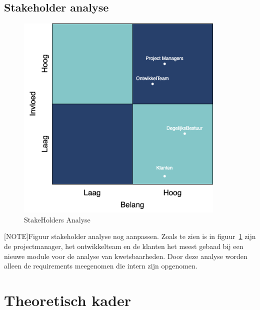 \subsection{Stakeholder analyse}\label{subsec:stakeholder-analyse1}
\begin{figure}[H]
    \myfloatalign
    \includegraphics[width=10cm]{gfx/stakeholderanalyse}
    \caption{StakeHolders Analyse}
    \label{fig:StakeholderAnalyse1}
\end{figure}
[NOTE]Figuur stakeholder analyse nog aanpassen.
Zoals te zien is in figuur~\ref{fig:StakeholderAnalyse1} zijn de projectmanager, het ontwikkelteam en de klanten het meest gebaad bij een nieuwe module voor de analyse van kwetsbaarheden.
Door deze analyse worden alleen de requirements meegenomen die intern zijn opgenomen.


\section{Theoretisch kader}\label{sec:theoretisch-kader}

